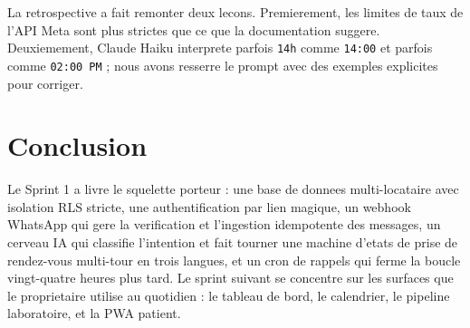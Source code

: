 La retrospective a fait remonter deux lecons. Premierement, les
limites de taux de l'API Meta sont plus strictes que ce que la
documentation suggere. Deuxiemement, Claude Haiku interprete parfois
\texttt{14h} comme \texttt{14:00} et parfois comme \texttt{02:00 PM} ;
nous avons resserre le prompt avec des exemples explicites pour
corriger.

\section{Conclusion}
Le Sprint 1 a livre le squelette porteur : une base de donnees
multi-locataire avec isolation RLS stricte, une authentification par
lien magique, un webhook WhatsApp qui gere la verification et
l'ingestion idempotente des messages, un cerveau IA qui classifie
l'intention et fait tourner une machine d'etats de prise de
rendez-vous multi-tour en trois langues, et un cron de rappels qui
ferme la boucle vingt-quatre heures plus tard. Le sprint suivant se
concentre sur les surfaces que le proprietaire utilise au quotidien :
le tableau de bord, le calendrier, le pipeline laboratoire, et la PWA
patient.
